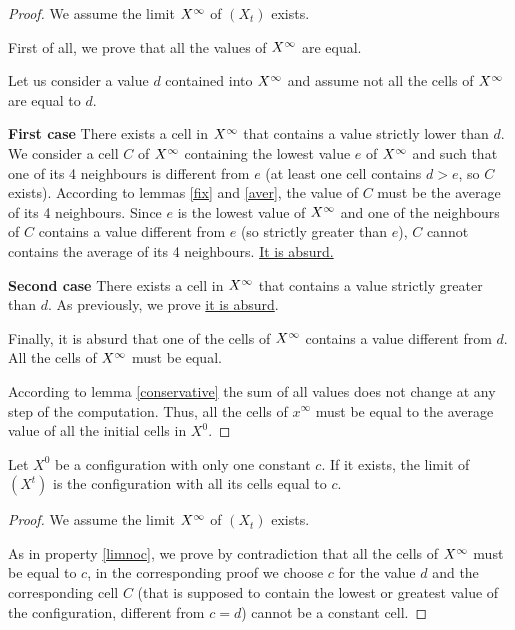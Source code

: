 \begin{proof}
  We assume the limit $X^{\infty}$ of $(X_t)$ exists.
  
  First of all, we prove that all the values of $X^{\infty}$ are equal. 
  
  Let us consider a value $d$ contained into $X^{\infty}$ and assume not all the cells of $X^{\infty}$ are equal to $d$.
  
  \textbf{First case} There exists a cell in $X^{\infty}$ that contains a value strictly lower than $d$. We consider a cell $C$ of $X^{\infty}$ containing the lowest value $e$ of $X^{\infty}$ and such that one of its 4 neighbours is different from $e$ (at least one cell contains $d > e$, so $C$ exists). According to lemmas \ref{fix} and \ref{aver}, the value of $C$ must be the average of its 4 neighbours. Since $e$ is the lowest value of $X^{\infty}$ and one of the neighbours of $C$ contains a value different from $e$ (so strictly greater than $e$), $C$ cannot contains the average of its 4 neighbours. \underline{It is absurd.}

  \textbf{Second case} There exists a cell in $X^{\infty}$ that contains a value strictly greater than $d$. As previously, we prove \underline{it is absurd}.
  
  Finally, it is absurd that one of the cells of $X^{\infty}$ contains a value different from $d$. All the cells of $X^{\infty}$ must be equal.
  
  According to lemma \ref{conservative} the sum of all values does not change at any step of the computation. Thus, all the cells of $x^{\infty}$ must be equal to the average value of all the initial cells in $X^0$.  
\end{proof}


\begin{prop}
  \label{twocst}
  Let $X^0$ be a configuration with only one constant $c$. If it exists, the limit of $(X^t)$ is the configuration with all its cells equal to $c$.
\end{prop}

\begin{proof}
  We assume the limit $X^{\infty}$ of $(X_t)$ exists.
  
  As in property \ref{limnoc}, we prove by contradiction that all the cells of $X^{\infty}$ must be equal to $c$, in the corresponding proof we choose $c$ for the value $d$ and the corresponding cell $C$ (that is supposed to contain the lowest or greatest value of the configuration, different from $c=d$) cannot be a constant cell.
\end{proof}

